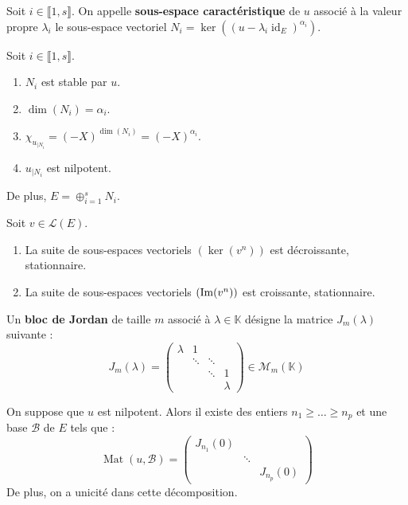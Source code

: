 	\begin{definition}
		Soit $i \in \llbracket 1, s \rrbracket$. On appelle \textbf{sous-espace caractéristique} de $u$ associé à la valeur propre $\lambda_i$ le sous-espace vectoriel $N_i = \ker((u-\lambda_i \operatorname{id}_E)^{\alpha_i})$.
	\end{definition}

	\begin{proposition}
		Soit $i \in \llbracket 1, s \rrbracket$.
		\begin{enumerate}[label=(\roman*)]
			\item $N_i$ est stable par $u$.
			\item $\dim(N_i) = \alpha_i$.
			\item $\chi_{u_{|N_i}} = (-X)^{\dim(N_i)} = (-X)^{\alpha_i}$.
			\item $u_{|N_i}$ est nilpotent.
		\end{enumerate}
		De plus, $E = \oplus_{i=1}^s N_i$.
	\end{proposition}

	\begin{proposition}
		Soit $v \in \mathcal{L}(E)$.
		\begin{enumerate}[label=(\roman*)]
			\item La suite de sous-espaces vectoriels $(\ker(v^n))$ est décroissante, stationnaire.
			\item La suite de sous-espaces vectoriels $(\mathrm{Im}(v^n))$ est croissante, stationnaire.
		\end{enumerate}
	\end{proposition}


	\begin{definition}
		Un \textbf{bloc de Jordan} de taille $m$ associé à $\lambda \in \mathbb{K}$ désigne la matrice $J_m(\lambda)$ suivante :
		\[ J_m(\lambda) = \begin{pmatrix} \lambda & 1 & \\ & \ddots & \ddots & \\ & & \ddots & 1 \\ & & & \lambda \end{pmatrix} \in \mathcal{M}_m(\mathbb{K}) \]
	\end{definition}

	\begin{application}
		On suppose que $u$ est nilpotent. Alors il existe des entiers $n_1 \geq \dots \geq n_p$ et une base $\mathcal{B}$ de $E$ tels que :
		\[ \operatorname{Mat}(u, \mathcal{B}) = \begin{pmatrix} J_{n_1}(0) & & \\ & \ddots & \\ & & J_{n_p}(0) \end{pmatrix} \]
		De plus, on a unicité dans cette décomposition.
	\end{application}

